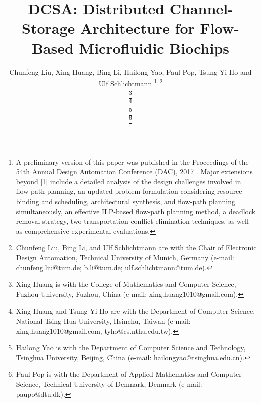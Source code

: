 \documentclass[journal]{IEEEtran}
\begin{document}
\allowdisplaybreaks[1]

\graphicspath{{Fig/}}
\def\figname{Fig.}
\def\algname{Algorithm}
\newcommand{\figurefontsize}{\small}
\newcommand{\papertitle}{DCSA: Distributed Channel-Storage Architecture for Flow-Based Microfluidic Biochips}
\newcommand{\tum}{Technical University of Munich (TUM)}



\title{\papertitle}

\author{	

Chunfeng Liu, Xing Huang, Bing Li, Hailong Yao, Paul Pop, Tsung-Yi Ho and Ulf Schlichtmann
 \thanks{A preliminary version of this paper was published in
the Proceedings of the 54th Annual Design Automation Conference (DAC), 2017 \cite{liu2017transport}. Major extensions beyond [1] include a detailed analysis of the design challenges involved in flow-path planning, an updated problem formulation considering resource binding and scheduling, architectural synthesis, and flow-path planning simultaneously, an effective ILP-based flow-path planning method, a deadlock removal strategy, two transportation-conflict elimination techniques, as well as comprehensive experimental evaluations.
}
\thanks{Chunfeng Liu, Bing Li, and Ulf Schlichtmann are with the Chair of
  Electronic Design Automation, Technical University of Munich, Germany (e-mail: chunfeng.liu@tum.de; b.li@tum.de; ulf.schlichtmann@tum.de).}

\thanks{Xing Huang is with the College of Mathematics and Computer Science, Fuzhou University, Fuzhou, China (e-mail: xing.huang1010@gmail.com).}

\thanks{Xing Huang and Tsung-Yi Ho are with the Department of Computer Science, National Tsing Hua University, Hsinchu, Taiwan (e-mail: xing.huang1010@gmail.com, tyho@cs.nthu.edu.tw).}

\thanks{Hailong Yao is with the Department of Computer Science and Technology, Tsinghua University, Beijing, China (e-mail: hailongyao@tsinghua.edu.cn).}

\thanks{Paul Pop is with the Department of Applied Mathematics and Computer Science, Technical University of Denmark, Denmark (e-mail: paupo@dtu.dk).}
}
\end{document}
